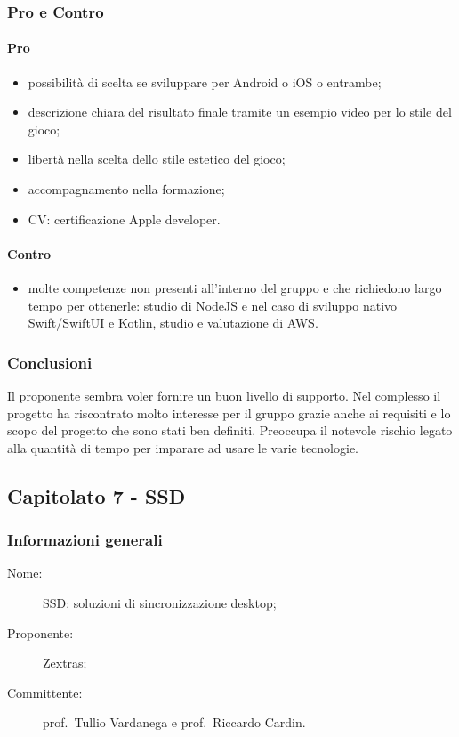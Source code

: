 \subsubsection{Pro e Contro}
\paragraph*{Pro}
\begin{itemize}
	\item possibilità di scelta se sviluppare per Android o iOS o entrambe;
	\item descrizione chiara del risultato finale tramite un esempio video per lo stile del gioco;
	\item libertà nella scelta dello stile estetico del gioco;
	\item accompagnamento nella formazione;
	\item CV: certificazione Apple developer.
\end{itemize}
\paragraph*{Contro}
\begin{itemize}
	\item molte competenze non presenti all'interno del gruppo e che richiedono largo tempo per ottenerle: studio di NodeJS e nel caso di sviluppo nativo Swift/SwiftUI e Kotlin, studio e valutazione di AWS.
\end{itemize}
\subsubsection{Conclusioni}
Il proponente sembra voler fornire un buon livello di supporto. Nel complesso il progetto ha riscontrato molto interesse per il gruppo grazie anche ai requisiti e lo scopo del progetto che sono stati ben definiti. Preoccupa il notevole rischio legato alla quantità di tempo per imparare ad usare le varie tecnologie.

\subsection{Capitolato 7 - SSD}
\subsubsection{Informazioni generali}
\begin{description}
	\item[Nome:] SSD: soluzioni di sincronizzazione desktop;
	\item[Proponente:] Zextras;
	\item[Committente:] prof.~Tullio Vardanega e prof.~Riccardo Cardin.
\end{description}
